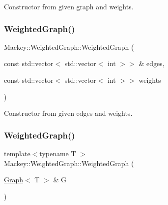 Constructor from given graph and weights. 

\mbox{\label{classMackey_1_1WeightedGraph_a962738a9a66a39f7fb2005411bf56818}} 
\subsubsection{\texorpdfstring{Weighted\+Graph()}{WeightedGraph()}\hspace{0.1cm}{\footnotesize\ttfamily [3/4]}}
{\footnotesize\ttfamily Mackey\+::\+Weighted\+Graph\+::\+Weighted\+Graph (\begin{DoxyParamCaption}\item[{const std\+::vector$<$ std\+::vector$<$ int $>$$>$ \&}]{edges,  }\item[{const std\+::vector$<$ std\+::vector$<$ int $>$$>$}]{weights }\end{DoxyParamCaption})\hspace{0.3cm}{\ttfamily [inline]}}



Constructor from given edges and weights. 

\mbox{\label{classMackey_1_1WeightedGraph_ad5932440f83ea50f802d96b44c2da5e3}} 
\subsubsection{\texorpdfstring{Weighted\+Graph()}{WeightedGraph()}\hspace{0.1cm}{\footnotesize\ttfamily [4/4]}}
{\footnotesize\ttfamily template$<$typename T $>$ \\
Mackey\+::\+Weighted\+Graph\+::\+Weighted\+Graph (\begin{DoxyParamCaption}\item[{\hyperlink{classMackey_1_1Graph}{Graph}$<$ T $>$ \&}]{G }\end{DoxyParamCaption})\hspace{0.3cm}{\ttfamily [inline]}}



